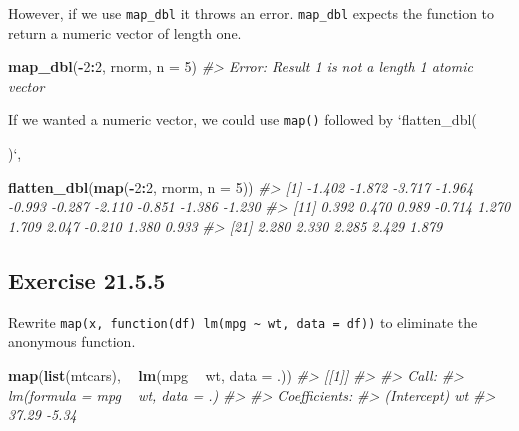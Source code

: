\documentclass[]{book}
\newenvironment{Shaded}{\begin{snugshade}}{\end{snugshade}}
\newcommand{\CommentTok}[1]{\textcolor[rgb]{0.56,0.35,0.01}{\textit{#1}}}
\newcommand{\DataTypeTok}[1]{\textcolor[rgb]{0.13,0.29,0.53}{#1}}
\newcommand{\DecValTok}[1]{\textcolor[rgb]{0.00,0.00,0.81}{#1}}
\newcommand{\KeywordTok}[1]{\textcolor[rgb]{0.13,0.29,0.53}{\textbf{#1}}}
\newcommand{\NormalTok}[1]{#1}
\newcommand{\OperatorTok}[1]{\textcolor[rgb]{0.81,0.36,0.00}{\textbf{#1}}}
\newcommand{\StringTok}[1]{\textcolor[rgb]{0.31,0.60,0.02}{#1}}
\theoremstyle{plain}
\theoremstyle{remark}
\begin{document}
However, if we use \texttt{map\_dbl} it throws an error.
\texttt{map\_dbl} expects the function to return a numeric vector of
length one.

\begin{Shaded}
\begin{Highlighting}[]
\KeywordTok{map_dbl}\NormalTok{(}\OperatorTok{-}\DecValTok{2}\OperatorTok{:}\DecValTok{2}\NormalTok{, rnorm, }\DataTypeTok{n =} \DecValTok{5}\NormalTok{)}
\CommentTok{#> Error: Result 1 is not a length 1 atomic vector}
\end{Highlighting}
\end{Shaded}

If we wanted a numeric vector, we could use \texttt{map()} followed by
`flatten\_dbl(

)`,

\begin{Shaded}
\begin{Highlighting}[]
\KeywordTok{flatten_dbl}\NormalTok{(}\KeywordTok{map}\NormalTok{(}\OperatorTok{-}\DecValTok{2}\OperatorTok{:}\DecValTok{2}\NormalTok{, rnorm, }\DataTypeTok{n =} \DecValTok{5}\NormalTok{))}
\CommentTok{#>  [1] -1.402 -1.872 -3.717 -1.964 -0.993 -0.287 -2.110 -0.851 -1.386 -1.230}
\CommentTok{#> [11]  0.392  0.470  0.989 -0.714  1.270  1.709  2.047 -0.210  1.380  0.933}
\CommentTok{#> [21]  2.280  2.330  2.285  2.429  1.879}
\end{Highlighting}
\end{Shaded}

\hypertarget{exercise-21.5.5}{%
\subsection*{\texorpdfstring{Exercise
{21.5.5}}{Exercise 21.5.5}}\label{exercise-21.5.5}}

Rewrite
\texttt{map(x,\ function(df)\ lm(mpg\ \textasciitilde{}\ wt,\ data\ =\ df))}
to eliminate the anonymous function.

\begin{Shaded}
\begin{Highlighting}[]
\KeywordTok{map}\NormalTok{(}\KeywordTok{list}\NormalTok{(mtcars), }\OperatorTok{~}\StringTok{ }\KeywordTok{lm}\NormalTok{(mpg }\OperatorTok{~}\StringTok{ }\NormalTok{wt, }\DataTypeTok{data =}\NormalTok{ .))}
\CommentTok{#> [[1]]}
\CommentTok{#> }
\CommentTok{#> Call:}
\CommentTok{#> lm(formula = mpg ~ wt, data = .)}
\CommentTok{#> }
\CommentTok{#> Coefficients:}
\CommentTok{#> (Intercept)           wt  }
\CommentTok{#>       37.29        -5.34}
\end{Highlighting}
\end{Shaded}
\end{document}
